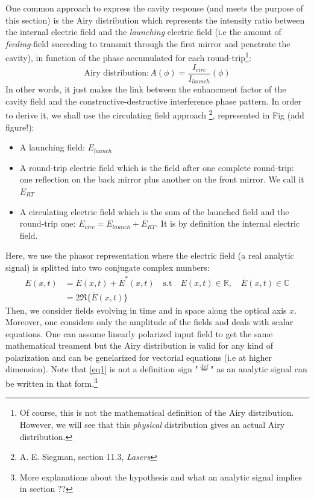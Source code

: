 \documentclass[10pt]{report}
\begin{document}
One common approach to express the cavity response (and meets the purpose of this section) is the Airy distribution which represents the intensity ratio between the internal electric field and the \textit{launching} electric field (i.e the amount of \textit{feeding}-field succeding to transmit through the first mirror and penetrate the cavity), in function of the phase accumulated for each round-trip\footnote{Of course, this is not the mathematical definition of the Airy distribution. However, we will see that this \textit{physical} distribution gives an actual Airy distribution.}:
\begin{equation}
\label{eqairy}
\textrm{Airy distribution} : A(\phi) = \frac{I_{circ}}{I_{launch}}(\phi)
\end{equation} 
In other words, it just makes the link between the enhancment factor of the cavity field and the constructive-destructive interference phase pattern. In order to derive it, we shall use the circulating field approach \footnote{A. E. Siegman, section 11.3, \textit{Lasers}}, represented in Fig (add figure!):
\begin{itemize}
	\item A launching field: $ E_{launch} $
	\item A round-trip electric field which is the field after one complete round-trip: one reflection on the back mirror plus another on the front mirror. We call it $ E_{RT}$
	\item A circulating electric field which is the sum of the launched field and the round-trip one: $ E_{circ} =  E_{launch} + E_{RT}$. It is by definition the internal electric field.
\end{itemize}

Here, we use the phasor representation where the electric field (a real analytic signal) is splitted into two conjugate complex numbers:
\begin{align} 
\label{eq1}
E(x, t) &= \overline{E}(x, t) + \overline{E}^*(x, t) \quad \textrm{s.t} \quad E(x, t) \in \mathbb{R}, \quad \overline{E}(x, t) \in \mathbb{C} \\\label{eq2}
&= 2 \Re \{  \overline{E}(x, t) \} 
\end{align}
Then, we consider fields evolving in time and in space along the optical axis $ x$. Moreover, one considers only the amplitude of the fields and deals with scalar equations. One can assume linearly polarized input field to get the same mathematical treament but the Airy distribution is valid for any kind of polarization and can be genelarized for vectorial equations (i.e at higher dimension). Note that \eqref{eq1} is not a definition sign "$\stackrel{\text{def}}{=}$" as an analytic signal can be written in that form.\footnote{More explanations about the hypothesis and what an analytic signal implies in section ??}
\end{document}
